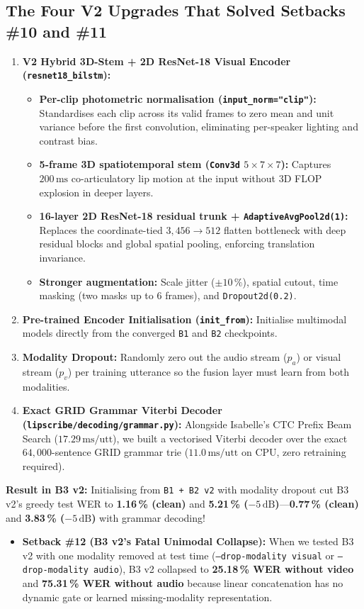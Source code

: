 \documentclass[11pt,a4paper]{article}
\newcommand{\code}[1]{\texttt{\small #1}}
\begin{document}
\subsection{The Four V2 Upgrades That Solved Setbacks \#10 and \#11}
\begin{enumerate}
  \item \textbf{V2 Hybrid 3D-Stem + 2D ResNet-18 Visual Encoder (\code{resnet18\_bilstm}):}
    \begin{itemize}
      \item \textbf{Per-clip photometric normalisation (\code{input\_norm="clip"}):} Standardises each clip across its valid frames to zero mean and unit variance before the first convolution, eliminating per-speaker lighting and contrast bias.
      \item \textbf{5-frame 3D spatiotemporal stem (\code{Conv3d} $5{\times}7{\times}7$):} Captures $200\,\text{ms}$ co-articulatory lip motion at the input without 3D FLOP explosion in deeper layers.
      \item \textbf{16-layer 2D ResNet-18 residual trunk + \code{AdaptiveAvgPool2d(1)}:} Replaces the coordinate-tied $3{,}456{\to}512$ flatten bottleneck with deep residual blocks and global spatial pooling, enforcing translation invariance.
      \item \textbf{Stronger augmentation:} Scale jitter ($\pm 10\,\%$), spatial cutout, time masking (two masks up to 6 frames), and \code{Dropout2d(0.2)}.
    \end{itemize}
  \item \textbf{Pre-trained Encoder Initialisation (\code{init\_from}):} Initialise multimodal models directly from the converged \code{B1} and \code{B2} checkpoints.
  \item \textbf{Modality Dropout:} Randomly zero out the audio stream ($p_a$) or visual stream ($p_v$) per training utterance so the fusion layer must learn from both modalities.
  \item \textbf{Exact GRID Grammar Viterbi Decoder (\code{lipscribe/decoding/grammar.py}):} Alongside Isabelle's CTC Prefix Beam Search ($17.29\,\text{ms/utt}$), we built a vectorised Viterbi decoder over the exact $64{,}000$-sentence GRID grammar trie ($11.0\,\text{ms/utt}$ on CPU, zero retraining required).
\end{enumerate}

\textbf{Result in B3 v2:} Initialising from \code{B1 + B2 v2} with modality dropout cut B3 v2's greedy test WER to \textbf{1.16\,\% (clean)} and \textbf{5.21\,\% ($-5\,\text{dB}$)}---\textbf{0.77\,\% (clean)} and \textbf{3.83\,\% ($-5\,\text{dB}$)} with grammar decoding!
\begin{itemize}
  \item \textbf{Setback \#12 (B3 v2's Fatal Unimodal Collapse):} When we tested B3 v2 with one modality removed at test time (\code{--drop-modality visual} or \code{--drop-modality audio}), B3 v2 collapsed to \textbf{25.18\,\% WER without video} and \textbf{75.31\,\% WER without audio} because linear concatenation has no dynamic gate or learned missing-modality representation.
\end{itemize}
\end{document}
